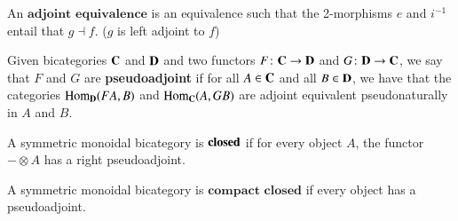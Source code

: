 \documentclass[oneside]{amsart}
\DeclareMathOperator\Hom{Hom}
\theoremstyle{definition}
\theoremstyle{remark}
\numberwithin{equation}{section}
\begin{document}
\begin{defn}
An $\textbf{adjoint equivalence}$ is an equivalence such that the 2-morphisms $e$ and $i^{-1}$ entail that $g \dashv f$. ($g$ is left adjoint to $f$)
\end{defn}

\begin{defn}
Given bicategories $\bold{C}$ and $\bold{D}$ and two functors $F \colon \bold{C} \to \bold{D}$ and $G \colon \bold{D} \to\bold{C}$, we say that $F$ and $G$ are \textbf{pseudoadjoint}  if for all $A \in \bold{C}$ and all $B \in \bold{D}$, we have that the categories $\Hom_{\bold{D}}(FA,B)$ and $\Hom_{\bold{C}}(A,GB)$ are adjoint equivalent pseudonaturally in $A$ and $B$.
\end{defn}

\begin{defn}
A symmetric monoidal bicategory is $\bold{closed}$ if for every object $A$, the functor $- \otimes A$ has a right pseudoadjoint.
\end{defn}

\begin{defn}
A symmetric monoidal bicategory is $\textbf{compact closed}$ if every object has a pseudoadjoint.
\end{defn}
\end{document}
